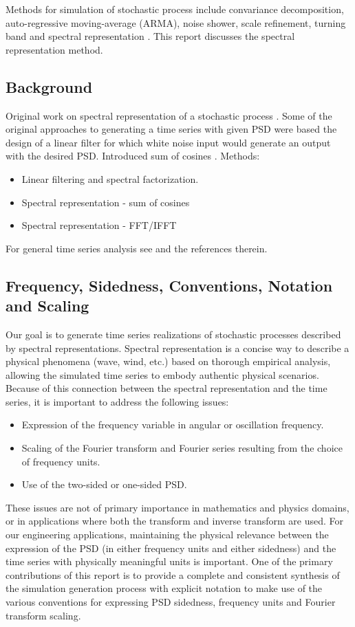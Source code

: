 \documentclass[11pt]{article}
\begin{document}
Methods for simulation of stochastic process include convariance decomposition, auto-regressive moving-average (ARMA), noise shower, scale refinement, turning band and spectral representation \cite{cao00simulation}.  This report discusses the spectral representation method.

\subsection{Background}
Original work on spectral representation of a stochastic process \cite{rice44mathematical1,rice45mathematical2}.  Some of the original approaches to generating a time series with given PSD were based the design of a linear filter for which white noise input would generate an output with the desired PSD.  Introduced sum of cosines \cite{borgman69ocean, shinozuka72monte}.  Methods:
\begin{itemize}
\item Linear filtering and spectral factorization.
\item Spectral representation - sum of cosines
\item Spectral representation - FFT/IFFT
\end{itemize}
\noindent
For general time series analysis see \cite{marchal15notes} and the references therein.

\subsection{Frequency, Sidedness, Conventions, Notation and Scaling}

Our goal is to generate time series realizations of stochastic processes described by spectral representations.  Spectral representation is a concise way to describe a physical phenomena (wave, wind, etc.) based on thorough empirical analysis, allowing the simulated time series to embody authentic physical scenarios.  Because of this connection between the spectral representation and the time series, it is important to address the following issues:
\begin{itemize}
\item Expression of the frequency variable in angular or oscillation frequency.
\item Scaling of the Fourier transform and Fourier series resulting from the choice of frequency units.
\item Use of the two-sided or one-sided PSD.
\end{itemize}
These issues are not of primary importance in mathematics and physics domains, or in applications where both the transform and inverse transform are used.  For our engineering applications, maintaining the physical relevance between the expression of the PSD (in either frequency units and either sidedness) and the time series with physically meaningful units is important.  One of the primary contributions of this report is to provide a complete and consistent synthesis of the simulation generation process with explicit notation to make use of the various conventions for expressing PSD sidedness, frequency units and Fourier transform scaling.
\end{document}
